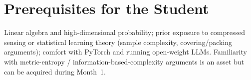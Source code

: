 \documentclass[11pt,a4paper]{article}
\theoremstyle{definition}
\begin{document}
\section{Prerequisites for the Student}

Linear algebra and high-dimensional probability; prior exposure to compressed
sensing or statistical learning theory (sample complexity, covering/packing
arguments); comfort with PyTorch and running open-weight LLMs. Familiarity with
metric-entropy / information-based-complexity arguments is an asset but can be
acquired during Month~1.



\end{document}
